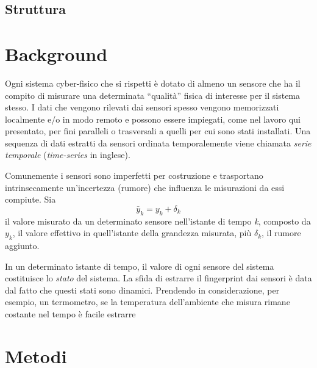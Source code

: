 \documentclass[Lau,binding=0.6cm]{sapthesis}
\begin{document}
\section{Struttura}



\chapter{Background}


Ogni sistema cyber-fisico che si rispetti è dotato di almeno un sensore che ha il compito di misurare una determinata ``qualità'' fisica di interesse per il sistema stesso. 
I dati che vengono rilevati dai sensori spesso vengono memorizzati localmente e/o in modo remoto e possono essere impiegati,
come nel lavoro qui presentato, per fini paralleli o trasversali a quelli per cui sono stati installati.
Una sequenza di dati estratti da sensori ordinata temporalemente viene chiamata \textit{serie temporale} (\textit{time-series} in inglese).

Comunemente i sensori sono imperfetti per costruzione e trasportano intrinsecamente un'incertezza (rumore) che influenza le misurazioni da essi compiute.
Sia 
$$
\bar{y}_{k} = y_{k} + \delta_{k}
$$
il valore misurato da un determinato sensore nell'istante di tempo \textit{k}, composto da $y_k$, il valore effettivo in quell'istante della grandezza misurata, più $\delta_k$, il rumore aggiunto.

In un determinato istante di tempo, il valore di ogni sensore del sistema costituisce lo \textit{stato} del sistema.
La sfida di estrarre il fingerprint dai sensori è data dal fatto che questi stati sono dinamici. 
Prendendo in considerazione, per esempio, un termometro, se la temperatura dell'ambiente che misura rimane costante nel tempo è facile estrarre


\chapter{Metodi}
\end{document}
